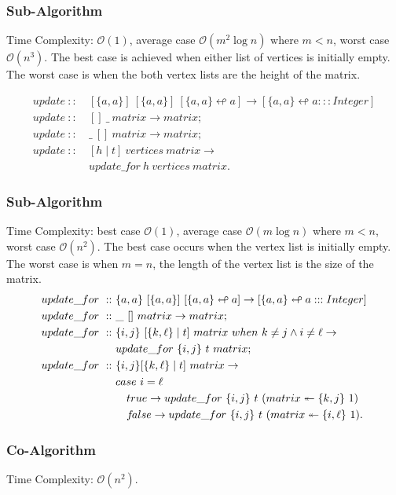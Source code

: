\documentclass[a4paper,10pt]{book}
\newcommand\when{\  when\ }
\newcommand{\false}{f\kern-0.25ex{alse}}
\begin{document}
\subsubsection{Sub-Algorithm}
Time Complexity: $\mathcal{O}(1)$, average case $\mathcal{O}(m^2\log n)$ where $m<n$, worst case $\mathcal{O}(n^3)$. The best case is achieved when either list of vertices is initially empty. The worst case is when the both vertex lists are the height of the matrix.

\begin{align*}
update\ ::\ &[\{a,a\}]\ [\{a,a\}]\ [\{a,a\}\looparrowleft a]\rightarrow [\{a,a\}\looparrowleft a:::Integer]\\
update\ ::\ &[]\ \_\ matrix\rightarrow matrix;\\
update\ ::\ &\_\ []\ matrix\rightarrow matrix;\\
update\ ::\ &[h\mid t]\ vertices\ matrix\rightarrow\\
	&update\_for\ h\ vertices\ matrix.
\end{align*}


\subsubsection{Sub-Algorithm}
Time Complexity: best case $\mathcal{O}(1)$, average case $\mathcal{O}(m\log n)$ where $m<n$, worst case $\mathcal{O}(n^2)$. The best case occurs when the vertex list is initially empty. The worst case is when $m=n$, the length of the vertex list is the size of the matrix.
\begin{align*}
update\_for\ ::\ &\{a,a\}\ [\{a,a\}]\ [\{a,a\}\looparrowleft a]\rightarrow [\{a,a\}\looparrowleft a:::Integer]\\
update\_for\ ::\ &\_\ []\ matrix\rightarrow matrix;\\
update\_for\ ::\ &\{i,j\}\ [\{k,\ell\}\mid t]\ matrix\when k \ne j\land i\ne \ell\rightarrow\\
	&update\_for\ \{i,j\}\ t\ matrix;\\
update\_for\ ::\ &\{i,j\} [\{k,\ell\}\mid t]\ matrix\rightarrow\\
	&case\ i=\ell\\
	&\quad true\rightarrow update\_for\ \{i,j\}\ t\ (matrix\twoheadleftarrow \{k,j\}\ 1)\\
	&\quad\false\rightarrow update\_for\ \{i,j\}\ t\ (matrix\twoheadleftarrow \{i,\ell\}\ 1).
\end{align*}

\subsubsection{Co-Algorithm}
Time Complexity: $\mathcal{O}(n^2)$.
\end{document}
